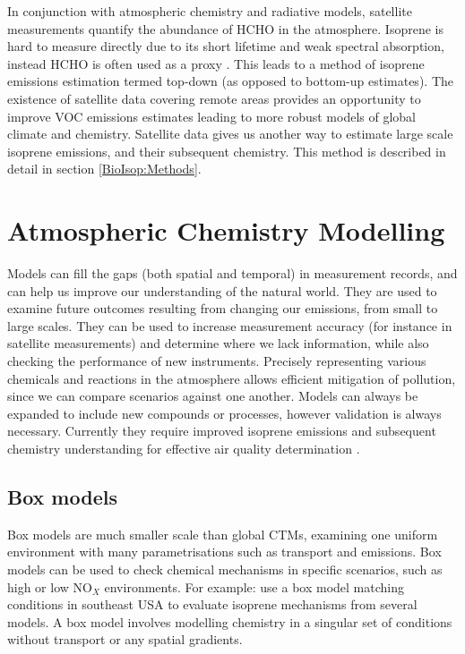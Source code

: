       In conjunction with atmospheric chemistry and radiative models, satellite measurements quantify the abundance of HCHO in the atmosphere.
      Isoprene is hard to measure directly due to its short lifetime and weak spectral absorption, instead HCHO is often used as a proxy \parencite{Millet2006, Fu2007, Dufour2009, Marais2012, bauwens2013satellite, Kefauver2014, Bauwens2016, Surl2018}.
      This leads to a method of isoprene emissions estimation termed top-down (as opposed to bottom-up estimates).
      The existence of satellite data covering remote areas provides an opportunity to improve VOC emissions estimates leading to more robust models of global climate and chemistry. 
      Satellite data gives us another way to estimate large scale isoprene emissions, and their subsequent chemistry.
      This method is described in detail in section \ref{BioIsop:Methods}.
  
\section{Atmospheric Chemistry Modelling}
\label{LR:Models}
  
  Models can fill the gaps (both spatial and temporal) in measurement records, and can help us improve our understanding of the natural world.
  They are used to examine future outcomes resulting from changing our emissions, from small to large scales.
  They can be used to increase measurement accuracy (for instance in satellite measurements) and determine where we lack information, while also checking the performance of new instruments.
  Precisely representing various chemicals and reactions in the atmosphere allows efficient mitigation of pollution, since we can compare scenarios against one another.
  Models can always be expanded to include new compounds or processes, however validation is always necessary.
  Currently they require improved isoprene emissions and subsequent chemistry understanding for effective air quality determination \parencite{Marvin2017}.
  
  \subsection{Box models}
    Box models are much smaller scale than global CTMs, examining one uniform environment with many parametrisations such as transport and emissions.
    Box models can be used to check chemical mechanisms in specific scenarios, such as high or low NO$_X$ environments.
    For example: \textcite{Marvin2017} use a box model matching conditions in southeast USA to evaluate isoprene mechanisms from several models.  
    A box model involves modelling chemistry in a singular set of conditions without transport or any spatial gradients.
    
